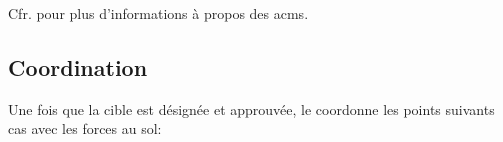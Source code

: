 \begin{e1}
\begin{e2}
\begin{e3}
\begin{e4}
			\end{e4}
			
		\end{e3}
		
		
	\end{e2}
	\begin{minipage}{\linewidth}
	 {}
	
	\begin{e3}
		 {}
		 {}
		 {}
		 {}
		 {}
		 {}
	\end{e3}
	\end{minipage}
	
	
	Cfr.  pour plus d'informations à propos des \glspl{acm}.
	
\end{e1}


\subsection{Coordination}

Une fois que la cible est désignée et approuvée, le \ja{} coordonne les points suivants \gls{cas} avec les forces au sol:

